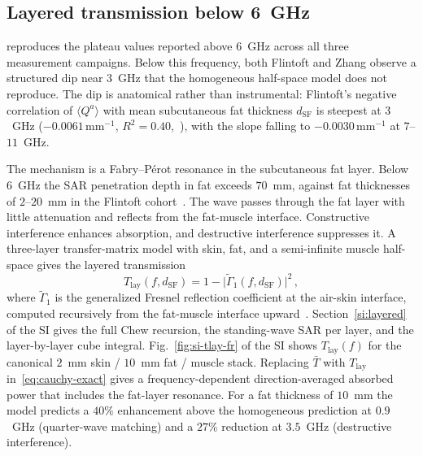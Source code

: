 \documentclass[journal,twocolumn,10pt]{IEEEtran}
\theoremstyle{plain}
\theoremstyle{remark}
\newcommand{\Tbar}{\bar{T}}
\newcommand{\Tlay}{T_{\mathrm{lay}}}
\begin{document}
\subsection{Layered transmission below 6~GHz}\label{subsec:fp}

 reproduces the plateau values reported above
$6$~GHz across all three measurement campaigns. Below this
frequency, both Flintoft and Zhang observe a structured dip near
$3$~GHz that the homogeneous half-space model does not reproduce. The
dip is anatomical rather than instrumental: Flintoft's negative
correlation of $\langle Q^a\rangle$ with mean subcutaneous fat
thickness $d_{\mathrm{SF}}$ is steepest at $3$~GHz
($-0.0061\,\mathrm{mm}^{-1}$, $R^2 = 0.40$,~\cite[Table~6]{Flintoft2014}),
with the slope falling to $-0.0030\,\mathrm{mm}^{-1}$ at $7$--$11$~GHz.

The mechanism is a Fabry--P\'erot resonance in the subcutaneous fat
layer. Below $6$~GHz the SAR penetration depth in fat exceeds
$70$~mm, against fat thicknesses of $2$--$20$~mm in the Flintoft
cohort~\cite[Table~1]{Flintoft2014}. The wave passes through the fat
layer with little attenuation and reflects from the fat-muscle
interface.
Constructive interference enhances absorption, and destructive
interference suppresses it. A three-layer transfer-matrix model with
skin, fat, and a semi-infinite muscle half-space gives the layered
transmission
\begin{equation}\label{eq:T-lay}
  \Tlay(f, d_{\mathrm{SF}})
  = 1 - \bigl|\widetilde{\Gamma}_1(f, d_{\mathrm{SF}})\bigr|^2\, ,
\end{equation}
where $\widetilde{\Gamma}_1$ is the generalized Fresnel reflection
coefficient at the air-skin interface, computed recursively from the
fat-muscle interface upward~\cite{Chew1995,BornWolf1999}.
Section~\ref{si:layered} of the SI gives the full Chew recursion,
the standing-wave SAR per layer, and the layer-by-layer cube
integral. Fig.~\ref{fig:si-tlay-fr} of the SI shows $\Tlay(f)$ for
the canonical $2$~mm skin / $10$~mm fat / muscle stack. Replacing
$\Tbar$ with $\Tlay$ in~\eqref{eq:cauchy-exact} gives a
frequency-dependent direction-averaged absorbed power that includes
the fat-layer resonance. For a fat thickness of $10$~mm the model
predicts a $40\%$ enhancement above the homogeneous prediction at
$0.9$~GHz (quarter-wave matching) and a $27\%$ reduction at
$3.5$~GHz (destructive interference).
\end{document}

